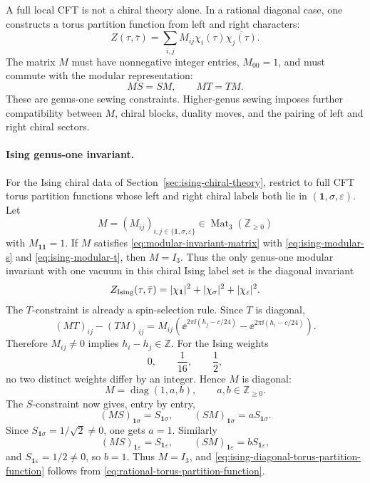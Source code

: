 A full local CFT is not a chiral theory alone.  In a rational diagonal case,
one constructs a torus partition function from left and right characters:
\begin{equation}
  Z(\tau,\bar\tau)
  =
  \sum_{i,j}M_{ij}\chi_i(\tau)\overline{\chi_j(\tau)} .
  \label{eq:rational-torus-partition-function}
\end{equation}
The matrix \(M\) must have nonnegative integer entries, \(M_{00}=1\), and must
commute with the modular representation:
\begin{equation}
  MS=SM,\qquad MT=TM .
  \label{eq:modular-invariant-matrix}
\end{equation}
These are genus-one sewing constraints.  Higher-genus sewing imposes further
compatibility between \(M\), chiral blocks, duality moves, and the pairing of
left and right chiral sectors.

\paragraph{Ising genus-one invariant.}
For the Ising chiral data of Section~\ref{sec:ising-chiral-theory},
restrict to full CFT
torus partition functions whose left and right chiral labels both lie in
\((\mathbf 1,\sigma,\varepsilon)\).  Let
\[
  M=(M_{ij})_{i,j\in\{\mathbf 1,\sigma,\varepsilon\}}
  \in \operatorname{Mat}_3(\mathbb Z_{\ge0})
\]
with \(M_{\mathbf 1\mathbf 1}=1\).  If \(M\) satisfies
\eqref{eq:modular-invariant-matrix} with
\eqref{eq:ising-modular-s} and \eqref{eq:ising-modular-t}, then \(M=I_3\).
Thus the only genus-one modular invariant with one vacuum in this chiral
Ising label set is the diagonal invariant
\begin{equation}
  Z_{\rm Ising}(\tau,\bar\tau)
  =
  |\chi_{\mathbf 1}|^2+|\chi_\sigma|^2+|\chi_\varepsilon|^2 .
  \label{eq:ising-diagonal-torus-partition-function}
\end{equation}
The \(T\)-constraint is already a spin-selection rule.  Since \(T\) is
diagonal,
\[
  (MT)_{ij}-(TM)_{ij}
  =
  M_{ij}\left(
    \ee^{2\pi\ii(h_j-c/24)}
    -
    \ee^{2\pi\ii(h_i-c/24)}
  \right).
\]
Therefore \(M_{ij}\ne0\) implies \(h_i-h_j\in\mathbb Z\).  For the Ising
weights
\[
  0,\qquad \frac1{16},\qquad \frac12,
\]
no two distinct weights differ by an integer.  Hence \(M\) is diagonal:
\[
  M=\operatorname{diag}(1,a,b),
  \qquad a,b\in\mathbb Z_{\ge0}.
\]
The \(S\)-constraint now gives, entry by entry,
\[
  (MS)_{\mathbf 1\sigma}=S_{\mathbf 1\sigma},
  \qquad
  (SM)_{\mathbf 1\sigma}=aS_{\mathbf 1\sigma}.
\]
Since \(S_{\mathbf 1\sigma}=1/\sqrt2\ne0\), one gets \(a=1\).  Similarly
\[
  (MS)_{\mathbf 1\varepsilon}=S_{\mathbf 1\varepsilon},
  \qquad
  (SM)_{\mathbf 1\varepsilon}=bS_{\mathbf 1\varepsilon},
\]
and \(S_{\mathbf 1\varepsilon}=1/2\ne0\), so \(b=1\).  Thus
\(M=I_3\), and \eqref{eq:ising-diagonal-torus-partition-function} follows
from \eqref{eq:rational-torus-partition-function}.

